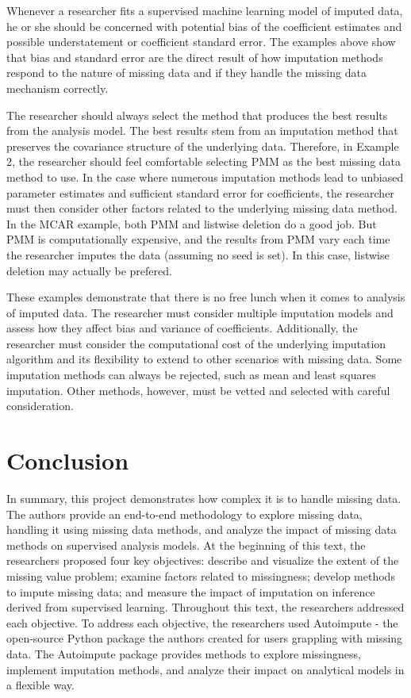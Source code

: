 \documentclass[12pt,oneside]{chicagocapstone}
\begin{document}
Whenever a researcher fits a supervised machine learning model of
imputed data, he or she should be concerned with potential bias of the
coefficient estimates and possible understatement or coefficient
standard error. The examples above show that bias and standard error are
the direct result of how imputation methods respond to the nature of
missing data and if they handle the missing data mechanism correctly.

The researcher should always select the method that produces the best
results from the analysis model. The best results stem from an
imputation method that preserves the covariance structure of the
underlying data. Therefore, in Example 2, the researcher should feel
comfortable selecting PMM as the best missing data method to use. In the
case where numerous imputation methods lead to unbiased parameter
estimates and sufficient standard error for coefficients, the researcher
must then consider other factors related to the underlying missing data
method. In the MCAR example, both PMM and listwise deletion do a good
job. But PMM is computationally expensive, and the results from PMM vary
each time the researcher imputes the data (assuming no seed is set). In
this case, listwise deletion may actually be prefered.

These examples demonstrate that there is no free lunch when it comes to
analysis of imputed data. The researcher must consider multiple
imputation models and assess how they affect bias and variance of
coefficients. Additionally, the researcher must consider the
computational cost of the underlying imputation algorithm and its
flexibility to extend to other scenarios with missing data. Some
imputation methods can always be rejected, such as mean and least
squares imputation. Other methods, however, must be vetted and selected
with careful consideration.

\chapter*{Conclusion}\label{conclusion}

In summary, this project demonstrates how complex it is to handle
missing data. The authors provide an end-to-end methodology to explore
missing data, handling it using missing data methods, and analyze the
impact of missing data methods on supervised analysis models. At the
beginning of this text, the researchers proposed four key objectives:
describe and visualize the extent of the missing value problem; examine
factors related to missingness; develop methods to impute missing data;
and measure the impact of imputation on inference derived from
supervised learning. Throughout this text, the researchers addressed
each objective. To address each objective, the researchers used
Autoimpute - the open-source Python package the authors created for
users grappling with missing data. The Autoimpute package provides
methods to explore missingness, implement imputation methods, and
analyze their impact on analytical models in a flexible way.
\end{document}
